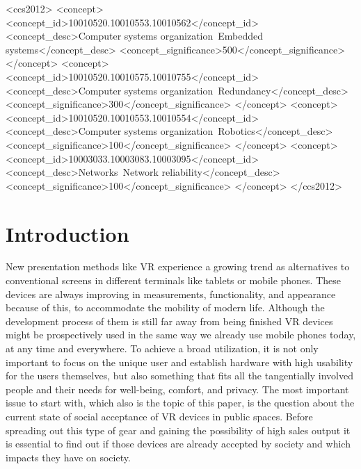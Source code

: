 \documentclass[sigchi]{acmart}
\begin{document}
\begin{CCSXML}
<ccs2012>
 <concept>
  <concept_id>10010520.10010553.10010562</concept_id>
  <concept_desc>Computer systems organization~Embedded systems</concept_desc>
  <concept_significance>500</concept_significance>
 </concept>
 <concept>
  <concept_id>10010520.10010575.10010755</concept_id>
  <concept_desc>Computer systems organization~Redundancy</concept_desc>
  <concept_significance>300</concept_significance>
 </concept>
 <concept>
  <concept_id>10010520.10010553.10010554</concept_id>
  <concept_desc>Computer systems organization~Robotics</concept_desc>
  <concept_significance>100</concept_significance>
 </concept>
 <concept>
  <concept_id>10003033.10003083.10003095</concept_id>
  <concept_desc>Networks~Network reliability</concept_desc>
  <concept_significance>100</concept_significance>
 </concept>
</ccs2012>
\end{CCSXML}




\maketitle

\section{Introduction}
New presentation methods like VR experience a growing trend as alternatives to conventional screens in different terminals like tablets or mobile phones. These devices are always improving in measurements, functionality, and appearance because of this, to accommodate the mobility of modern life. Although the development process of them is still far away from being finished VR devices might be prospectively used in the same way we already use mobile phones today, at any time and everywhere. To achieve a broad utilization, it is not only important to focus on the unique user and establish hardware with high usability for the users themselves, but also something that fits all the tangentially involved people and their needs for well-being, comfort, and privacy. The most important issue to start with, which also is the topic of this paper, is the question about the current state of social acceptance of VR devices in public spaces. Before spreading out this type of gear and gaining the possibility of high sales output it is essential to find out if those devices are already accepted by society and which impacts they have on society.
\end{document}
